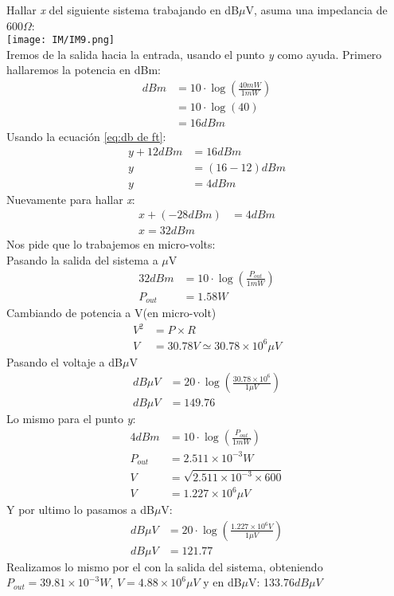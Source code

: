 \documentclass[
	12pt, %
	fleqn, %
	a4paper, %
]{LegrandOrangeBook}
\begin{document}
\begin{example}
Hallar \textit{x} del siguiente sistema trabajando en dB$\mu$V, asuma una impedancia de 600$\Omega$:\\
\texttt{[image: IM/IM9.png]}\\
Iremos de la salida hacia la entrada, usando el punto \textit{y} como ayuda. Primero hallaremos la potencia en dBm:
\begin{align*}
dBm&=10\cdot\log\left(\frac{40mW}{1mW}\right)\\
&=10\cdot\log\left(40\right)\\
&=16dBm
\end{align*}
Usando la ecuación \ref{eq:db de ft}:
\begin{align*}
y+12dBm&=16dBm\\
y&=(16-12)dBm\\
y&=4dBm
\end{align*}
Nuevamente para hallar \textit{x}:
\begin{align*}
x+(-28dBm)&=4dBm\\
x=32dBm
\end{align*}
Nos pide que lo trabajemos en micro-volts:\\
Pasando la salida del sistema a $\mu$V
\begin{align*}
32dBm&=10\cdot\log\left(\frac{P_{out}}{1mW}\right)\\
P_{out}&=1.58W
\end{align*}
Cambiando de potencia a V(en micro-volt)
\begin{align*}
V^2&=P\times R\\
V&=30.78V\simeq 30.78\times 10^6\mu V	
\end{align*}
Pasando el voltaje a dB$\mu$V
\begin{align*}
dB\mu V&=20\cdot\log\left(\frac{30.78\times 10^6}{1\mu V}\right)\\
dB\mu V&=149.76
\end{align*}
Lo mismo para el punto \textit{y}:
\begin{align*}
4dBm&=10\cdot\log\left(\frac{P_{out}}{1mW}\right)\\
P_{out}&=2.511\times 10^{-3}W\\
V&=\sqrt{2.511\times 10^{-3}\times 600}\\
V&=1.227\times 10^6\mu V
\end{align*}
Y por ultimo lo pasamos a dB$\mu$V:
\begin{align*}
dB\mu V&=20\cdot\log\left(\frac{1.227\times 10^6V}{1\mu V}\right)\\
dB\mu V&=121.77
\end{align*}
Realizamos lo mismo por el con la salida del sistema, obteniendo $P_{out}=39.81\times 10^{-3}W$, $V=4.88\times 10^6\mu V$ y en dB$\mu$V: 133.76$dB\mu V$
\end{example}
\end{document}
